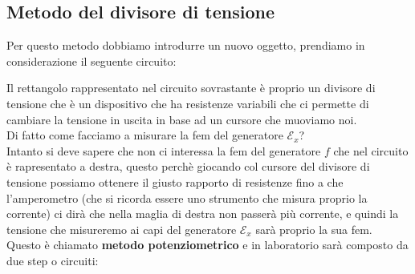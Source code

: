 \documentclass[a4paper, oneside]{article}
\newcommand{\E}{\mathcal{E}}
\begin{document}
\subsection{Metodo del divisore di tensione}
Per questo metodo dobbiamo introdurre un nuovo oggetto, prendiamo in considerazione il seguente circuito:
\begin{center}
\end{center}
Il rettangolo rappresentato nel circuito sovrastante è proprio un divisore di tensione che è un dispositivo che ha resistenze variabili che ci permette di cambiare la tensione in uscita in base ad un cursore che muoviamo noi.\\
Di fatto come facciamo a misurare la fem del generatore $\E_x$?\\
Intanto si deve sapere che non ci interessa la fem del generatore $f$ che nel circuito è rapresentato a destra, questo perchè giocando col cursore del divisore di tensione 
possiamo ottenere il giusto rapporto di resistenze fino a che l'amperometro (che si ricorda essere uno strumento che misura proprio la corrente) ci dirà che nella maglia di destra non passerà più corrente, e quindi la tensione che misureremo ai capi del generatore $\E_x$ sarà proprio la sua fem.\\
Questo è chiamato \textbf{metodo potenziometrico} e in laboratorio sarà composto da due step o circuiti:\\
\end{document}
